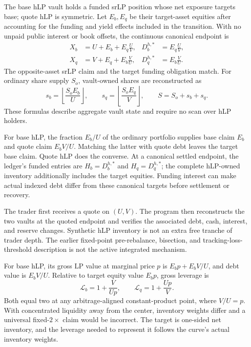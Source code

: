 The base hLP vault holds a funded srLP position whose net exposure targets base; quote hLP is symmetric. Let $E_b,E_q$ be their target-asset equities after accounting for the funding and yield effects included in the transition. With no unpaid public interest or book offsets, the continuous canonical endpoint is
\begin{align}
X_b&=U+E_b+E_q\frac UV,&
D_b^{h,*}&=E_q\frac UV,\\
X_q&=V+E_q+E_b\frac VU,&
D_q^{h,*}&=E_b\frac VU.
\label{eq:endpoint}
\end{align}
The opposite-asset srLP claim and the target funding obligation match. For ordinary share supply $S_o$, vault-owned shares are reconstructed as
\begin{equation}
s_b=\left\lfloor\frac{S_oE_b}{U}\right\rfloor,\qquad
s_q=\left\lfloor\frac{S_oE_q}{V}\right\rfloor,\qquad
S=S_o+s_b+s_q.
\label{eq:ownership}
\end{equation}
These formulas describe aggregate vault state and require no scan over hLP holders.

For base hLP, the fraction $E_b/U$ of the ordinary portfolio supplies base claim $E_b$ and quote claim $E_bV/U$. Matching the latter with quote debt leaves the target base claim. Quote hLP does the converse. At a canonical settled endpoint, the ledger's funded entries are $H_b=D_b^{h,*}$ and $H_q=D_q^{h,*}$; the complete hLP-owned inventory additionally includes the target equities. Funding interest can make actual indexed debt differ from these canonical targets before settlement or recovery.

The trader first receives a quote on $(U,V)$. The program then reconstructs the two vaults at the quoted endpoint and verifies the associated debt, cash, interest, and reserve changes. Synthetic hLP inventory is not an extra free tranche of trader depth. The earlier fixed-point pre-rebalance, bisection, and tracking-loss-threshold description is not the active integrated mechanism.

For base hLP, its gross LP value at marginal price $p$ is $E_bp+E_bV/U$, and debt value is $E_bV/U$. Relative to target equity value $E_bp$, gross leverage is
\begin{equation}
\mathcal L_b=1+\frac{V}{Up},\qquad
\mathcal L_q=1+\frac{Up}{V}.
\label{eq:leverage}
\end{equation}
Both equal two at any arbitrage-aligned constant-product point, where $V/U=p$. With concentrated liquidity away from the center, inventory weights differ and a universal fixed-$2\times$ claim would be incorrect. The target is one-sided net inventory, and the leverage needed to represent it follows the curve's actual inventory weights.

